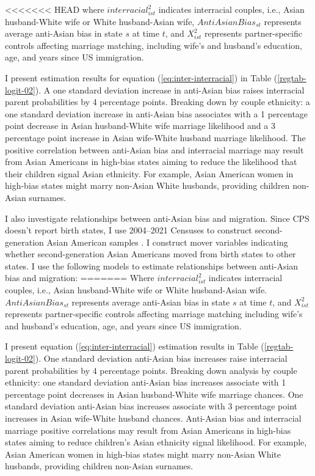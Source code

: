 <<<<<<< HEAD
where $interracial_{ist}^2$ indicates interracial couples, i.e., Asian husband-White wife or White husband-Asian wife, $AntiAsianBias_{st}$ represents average anti-Asian bias in state $s$ at time $t$, and $X_{ist}^2$ represents partner-specific controls affecting marriage matching, including wife's and husband's education, age, and years since US immigration.

I present estimation results for equation (\ref{eq:inter-interracial}) in Table (\ref{regtab-logit-02}). A one standard deviation increase in anti-Asian bias raises interracial parent probabilities by 4 percentage points. Breaking down by couple ethnicity: a one standard deviation increase in anti-Asian bias associates with a 1 percentage point decrease in Asian husband-White wife marriage likelihood and a 3 percentage point increase in Asian wife-White husband marriage likelihood. The positive correlation between anti-Asian bias and interracial marriage may result from Asian Americans in high-bias states aiming to reduce the likelihood that their children signal Asian ethnicity. For example, Asian American women in high-bias states might marry non-Asian White husbands, providing children non-Asian surnames.

I also investigate relationships between anti-Asian bias and migration. Since CPS doesn't report birth states, I use 2004--2021 Censuses to construct second-generation Asian American samples \autocite{floodsarahIntegratedPublicUse2021}. I construct mover variables indicating whether second-generation Asian Americans moved from birth states to other states. I use the following models to estimate relationships between anti-Asian bias and migration:
=======
Where $interracial_{ist}^2$ indicates interracial couples, i.e., Asian husband-White wife or White husband-Asian wife. $AntiAsianBias_{st}$ represents average anti-Asian bias in state $s$ at time $t$, and $X_{ist}^2$ represents partner-specific controls affecting marriage matching including wife's and husband's education, age, and years since US immigration.

I present equation (\ref{eq:inter-interracial}) estimation results in Table (\ref{regtab-logit-02}). One standard deviation anti-Asian bias increases raise interracial parent probabilities by 4 percentage points. Breaking down analysis by couple ethnicity: one standard deviation anti-Asian bias increases associate with 1 percentage point decreases in Asian husband-White wife marriage chances. One standard deviation anti-Asian bias increases associate with 3 percentage point increases in Asian wife-White husband chances. Anti-Asian bias and interracial marriage positive correlations may result from Asian Americans in high-bias states aiming to reduce children's Asian ethnicity signal likelihood. For example, Asian American women in high-bias states might marry non-Asian White husbands, providing children non-Asian surnames.

